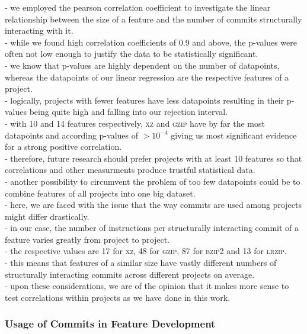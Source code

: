 - we employed the pearson correlation coefficient to investigate the linear relationship between the size of a feature and the number of commits structurally interacting with it. \\
- while we found high correlation coefficients of 0.9 and above, the p-values were often not low enough to justify the data to be statistically significant. \\
- we know that p-values are highly dependent on the number of datapoints, whereas the datapoints of our linear regression are the respective features of a project. \\
- logically, projects with fewer features have less datapoints resulting in their p-values being quite high and falling into our rejection interval. \\
- with 10 and 14 features respectively, \textsc{xz} and \textsc{gzip} have by far the most datapoints and according p-values of $>10^{-4}$ giving us most significant evidence for a strong positive correlation. \\
- therefore, future research should prefer projects with at least 10 features so that correlations and other measurments produce trustful statistical data. \\
- another possibility to circumvent the problem of too few datapoints could be to combine features of all projects into one big dataset. \\
- here, we are faced with the issue that the way commits are used among projects might differ drastically. \\
- in our case, the number of instructions per structurally interacting commit of a feature varies greatly from project to project. \\
- the respective values are 17 for \textsc{xz}, 48 for \textsc{gzip}, 87 for \textsc{bzip2} and 13 for \textsc{lrzip}. \\
- this means that features of a similar size have vastly different numbers of structurally interacting commits across different projects on average. \\
- upon these considerations, we are of the opinion that it makes more sense to test correlations within projects as we have done in this work. \\

\subsubsection*{Usage of Commits in Feature Development}

